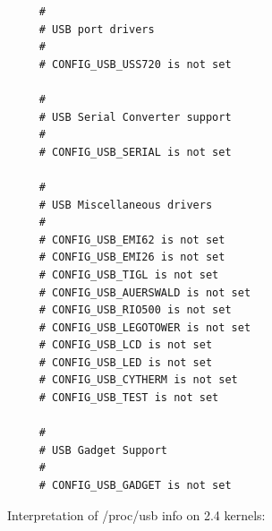 \begin{verbatim}
     #
     # USB port drivers
     #
     # CONFIG_USB_USS720 is not set
     
     #
     # USB Serial Converter support
     #
     # CONFIG_USB_SERIAL is not set
     
     #
     # USB Miscellaneous drivers
     #
     # CONFIG_USB_EMI62 is not set
     # CONFIG_USB_EMI26 is not set
     # CONFIG_USB_TIGL is not set
     # CONFIG_USB_AUERSWALD is not set
     # CONFIG_USB_RIO500 is not set
     # CONFIG_USB_LEGOTOWER is not set
     # CONFIG_USB_LCD is not set
     # CONFIG_USB_LED is not set
     # CONFIG_USB_CYTHERM is not set
     # CONFIG_USB_TEST is not set
     
     #
     # USB Gadget Support
     #
     # CONFIG_USB_GADGET is not set
\end{verbatim}
\normalsize

Interpretation of /proc/usb info on 2.4 kernels: 

